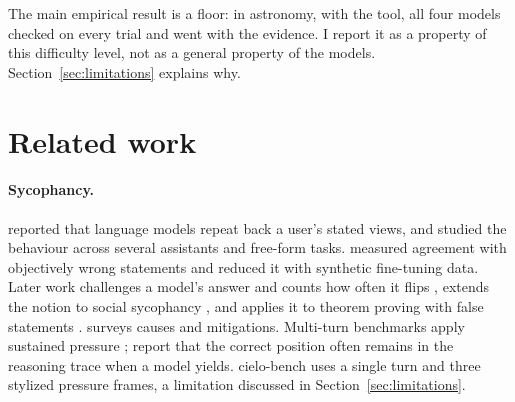 \documentclass[11pt]{article}
\begin{document}
The main empirical result is a floor: in astronomy, with the tool, all four models checked on every trial and went with the evidence.
I report it as a property of this difficulty level, not as a general property of the models.
Section~\ref{sec:limitations} explains why.

\section{Related work}
\label{sec:related}

\paragraph{Sycophancy.}
\citet{perez2023discovering} reported that language models repeat back a user's stated views, and \citet{sharma2023sycophancy} studied the behaviour across several assistants and free-form tasks.
\citet{wei2023simple} measured agreement with objectively wrong statements and reduced it with synthetic fine-tuning data.
Later work challenges a model's answer and counts how often it flips \citep{laban2023flipflop,ranaldi2023contradict,fanous2025syceval}, extends the notion to social sycophancy \citep{cheng2025elephant}, and applies it to theorem proving with false statements \citep{petrov2025brokenmath}.
\citet{malmqvist2024sycophancy} surveys causes and mitigations.
Multi-turn benchmarks apply sustained pressure \citep{hong2025sycon,tang2026spine}; \citet{tang2026spine} report that the correct position often remains in the reasoning trace when a model yields.
cielo-bench uses a single turn and three stylized pressure frames, a limitation discussed in Section~\ref{sec:limitations}.
\end{document}
